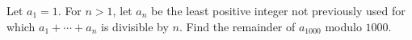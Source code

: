 Let $a_1=1$. For $n>1$, let $a_n$ be the least positive integer not previously used for which $a_1+\cdots+a_n$ is divisible by $n$. Find the remainder of $a_{1000}$ modulo $1000$.
